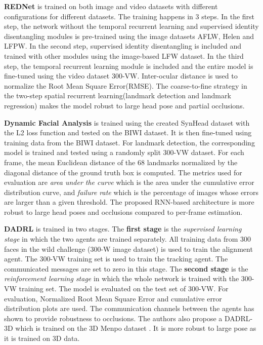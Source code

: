 \documentclass{llncs}
\begin{document}
\textbf{REDNet} \cite{rednet} is trained on both image and video datasets with different configurations for different datasets. The training happens in 3 steps. In the first step, the network without the temporal recurrent learning and supervised identity disentangling modules is pre-trained using the image datasets AFLW, Helen and LFPW. In the second step, supervised identity disentangling is included and trained with other modules using the image-based LFW dataset. In the third step, the temporal recurrent learning module is included and the entire model is fine-tuned using the video dataset 300-VW. Inter-ocular distance is used to normalize the Root Mean Square Error(RMSE).
The coarse-to-fine strategy in the two-step spatial recurrent learning(landmark detection and landmark regression) makes the model robust to large head pose and partial occlusions. 

\textbf{Dynamic Facial Analysis} \cite{dynamic_facial_analysis} is trained using the created SynHead dataset with the L2 loss function and tested on the BIWI dataset. It is then fine-tuned using training data from the BIWI dataset. For landmark detection, the corresponding model is trained and tested using a randomly split 300-VW dataset. For each frame, the mean Euclidean distance of the 68 landmarks normalized by the diagonal distance of the ground truth box is computed. The metrics used for evaluation are \textit{area under the curve} which is the area under the cumulative error distribution curve, and \textit{failure rate} which is the percentage of images whose errors are larger than a given threshold. The proposed RNN-based architecture is more robust to large head poses and occlusions  compared to per-frame estimation.
 

\textbf{DADRL} \cite{dadrl} is trained in two stages. The \textbf{first stage} is the \textit{supervised learning stage} in which the two agents are trained separately. All training data from 300 faces in the wild challenge (300-W image dataset) is used to train the alignment agent. The 300-VW training set is used to train the tracking agent. The communicated messages are set to zero in this stage. The \textbf{second stage} is the \textit{reinforcement learning stage} in which the whole network is trained with the 300-VW training set. The model is evaluated on the test set of 300-VW. For evaluation, Normalized Root Mean Square Error and cumulative error distribution plots are used. The communication channels between the agents has shown to provide robustness to occlusions. The authors also propose a DADRL-3D which is trained on the 3D Menpo dataset \cite{3d_menpo}. It is more robust to large pose as it is trained on 3D data.
\end{document}
